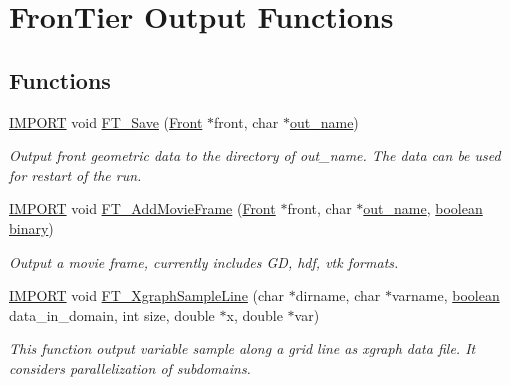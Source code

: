 \hypertarget{group___o_u_t_p_u_t}{}\section{Fron\+Tier Output Functions}
\label{group___o_u_t_p_u_t}
\subsection*{Functions}
\begin{DoxyCompactItemize}
\item 
\hyperlink{cdecs_8h_a773175d74e73776d69c3e538f17de1ee}{I\+M\+P\+O\+RT} void \hyperlink{group___o_u_t_p_u_t_gafd7ac13ea02e0f3844ebcb1a9efc60c0}{F\+T\+\_\+\+Save} (\hyperlink{fdecs_8h_ac32202b798f848095c489cfd04c4ca5f}{Front} $\ast$front, char $\ast$\hyperlink{testfront_8c_ad6f54b1083a26246f3aa355cff73fa2c}{out\+\_\+name})
\begin{DoxyCompactList}\small\item\em Output front geometric data to the directory of out\+\_\+name. The data can be used for restart of the run. \end{DoxyCompactList}\item 
\hyperlink{cdecs_8h_a773175d74e73776d69c3e538f17de1ee}{I\+M\+P\+O\+RT} void \hyperlink{group___o_u_t_p_u_t_gad32bc73d7f3427bc42db9a86a7fad142}{F\+T\+\_\+\+Add\+Movie\+Frame} (\hyperlink{fdecs_8h_ac32202b798f848095c489cfd04c4ca5f}{Front} $\ast$front, char $\ast$\hyperlink{testfront_8c_ad6f54b1083a26246f3aa355cff73fa2c}{out\+\_\+name}, \hyperlink{cdecs_8h_ad048433382a936258fb49e2ec4f148e1}{boolean} \hyperlink{i_fluid_8cpp_a95d2bcffcf88447457ccd073a80718c1}{binary})
\begin{DoxyCompactList}\small\item\em Output a movie frame, currently includes GD, hdf, vtk formats. \end{DoxyCompactList}\item 
\hyperlink{cdecs_8h_a773175d74e73776d69c3e538f17de1ee}{I\+M\+P\+O\+RT} void \hyperlink{group___o_u_t_p_u_t_ga4eb501b23f143596c39ede7060bb06db}{F\+T\+\_\+\+Xgraph\+Sample\+Line} (char $\ast$dirname, char $\ast$varname, \hyperlink{cdecs_8h_ad048433382a936258fb49e2ec4f148e1}{boolean} data\+\_\+in\+\_\+domain, int size, double $\ast$x, double $\ast$var)
\begin{DoxyCompactList}\small\item\em This function output variable sample along a grid line as xgraph data file. It considers parallelization of subdomains. \end{DoxyCompactList}\end{DoxyCompactItemize}


